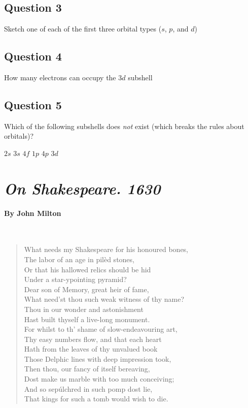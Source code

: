 \documentclass[11pt, letterpaper]{memoir}
\begin{document}
{	\subsection*{Question 3}
	Sketch one of each of the first three orbital types ($s$, $p$, and $d$)

	\vspace{3em}
	\subsection*{Question 4}
	How many electrons can occupy the $3d$ subshell
	
	\vspace{1em}
	\subsection*{Question 5}
	Which of the following subshells does \emph{not} exist (which breaks the rules about orbitals)?
	
	{\large $2s$ \hspace{3em} $3s$ \hspace{3em} $4f$ \hspace{3em} $1p$ \hspace{3em} $4p$ \hspace{3em} $3d$}


\newpage
\pagestyle{empty}
\addtocounter{page}{-1}
\section*{\emph{On Shakespeare. 1630}}
\paragraph{By John Milton}~
\begin{verse}
	What needs my Shakespeare for his honoured bones,\\
	The labor of an age in pilèd stones,\\
	Or that his hallowed relics should be hid\\
	Under a star-ypointing pyramid?\\
	Dear son of Memory, great heir of fame,\\
	What need’st thou such weak witness of thy name?\\
	Thou in our wonder and astonishment\\
	Hast built thyself a live-long monument.\\
	For whilst to th’ shame of slow-endeavouring art,\\
	Thy easy numbers flow, and that each heart\\
	Hath from the leaves of thy unvalued book\\
	Those Delphic lines with deep impression took,\\
	Then thou, our fancy of itself bereaving,\\
	Dost make us marble with too much conceiving;\\
	And so sepúlchred in such pomp dost lie,\\
	That kings for such a tomb would wish to die.
\end{verse}

}
\end{document}
